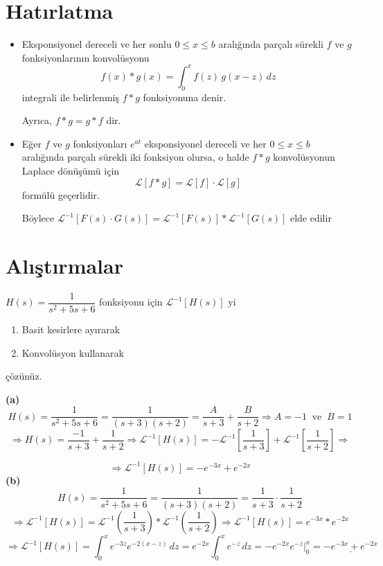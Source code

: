 \documentclass[11pt,a4paper]{article}
\begin{document}
\newcommand\Lk[1]{\mathcal{L}\left[#1\right]}
\newcommand\iLk[1]{\mathcal{L}^{-1}\left[#1\right]}
\newcommand\carp[1]{\mathpalette\carpb{#1}}%
\newcommand\carpb[2]{\tikz[baseline=(cc.base)]{\node[inner sep=0pt](cc){$#1#2$};\draw[line width=0.5pt](cc.south west)--(cc.north east);}}

\hfill{}
\section{Hatırlatma}
\begin{itemize}[label=$\ast$]
\item Eksponsiyonel dereceli ve her sonlu $0\le x\le b$ aralığında parçalı sürekli $f$ ve $g$ fonksiyonlarının konvolüsyonu
\[
f(x)*g(x) = \int_0^x f(z)\,g(x-z)\,dz
\]
integrali ile belirlenmiş $f*g$ fonksiyonuna denir.

Ayrıca, $f*g = g*f$ dir.
\item Eğer $f$ ve $g$ fonksiyonları $e^{at}$ eksponsiyonel dereceli ve her $0\le x\le b$ aralığında parçalı sürekli iki fonksiyon olursa, o halde $f*g$ konvolüsyonun Laplace dönüşümü için
\[
\Lk{f*g} = \Lk{f}\cdot\Lk{g}
\]
formülü geçerlidir.

Böylece $\iLk{F(s)\cdot G(s)} = \iLk{F(s)} * \iLk{G(s)}$ elde edilir
\end{itemize}

\section{Alıştırmalar}
\begin{ornek}[1]
$H(s) = \dfrac{1}{s^2+5s+6}$ fonksiyonu için $\iLk{H(s)}$ yi
\begin{enumerate}[label=(\alph*), noitemsep, topsep=2pt]
\item Basit kesirlere ayırarak
\item Konvolüsyon kullanarak
\end{enumerate}
çözünüz.
\end{ornek}
\begin{cozum}
\textbf{(a)}
\[
H(s) = \frac{1}{s^2+5s+6} = \frac{1}{(s+3)(s+2)} = \frac{A}{s+3} + \frac{B}{s+2} \Rightarrow A=-1 \ \text{ ve } \ B=1
\]
\[
\Rightarrow H(s) = \frac{-1}{s+3} + \frac{1}{s+2} \Rightarrow \iLk{H(s)} = -\iLk{\frac{1}{s+3}} + \iLk{\frac{1}{s+2}} \Rightarrow
\]

\[
\Rightarrow \iLk{H(s)} = -e^{-3x} + e^{-2x}
\]
\textbf{(b)}
\[
H(s) = \frac{1}{s^2+5s+6} = \frac{1}{(s+3)(s+2)} = \frac{1}{s+3}\cdot\frac{1}{s+2}
\]
\[
\Rightarrow \iLk{H(s)} = \mathcal{L}^{-1}\left(\frac{1}{s+3}\right) * \mathcal{L}^{-1}\left(\frac{1}{s+2}\right) \Rightarrow \iLk{H(s)} = e^{-3x} * e^{-2x}
\]
\[
\Rightarrow \iLk{H(s)} = \int_0^x e^{-3z}e^{-2(x-z)}\,dz = e^{-2x}\int_0^x e^{-z}\,dz = -e^{-2x}e^{-z}\Big|_0^x = \underline{-e^{-3x}+e^{-2x}}
\]
\end{cozum}
\end{document}
